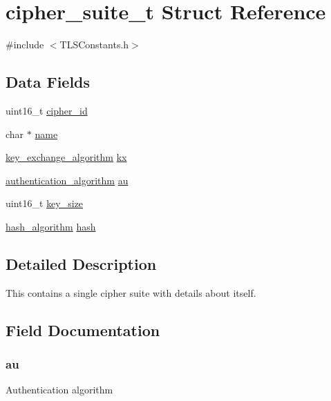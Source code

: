 \hypertarget{structcipher__suite__t}{}\section{cipher\+\_\+suite\+\_\+t Struct Reference}
\label{structcipher__suite__t}


{\ttfamily \#include $<$T\+L\+S\+Constants.\+h$>$}

\subsection*{Data Fields}
\begin{DoxyCompactItemize}
\item 
uint16\+\_\+t \hyperlink{structcipher__suite__t_abd7eac06ec5e8b636fe8916fff6c8dfa}{cipher\+\_\+id}
\item 
char $\ast$ \hyperlink{structcipher__suite__t_a5ac083a645d964373f022d03df4849c8}{name}
\item 
\hyperlink{_t_l_s_constants_8h_a7203e83530e35d8ed2f3300ba0408a54}{key\+\_\+exchange\+\_\+algorithm} \hyperlink{structcipher__suite__t_ad84bfc73673c813712dbbc08d89c53a9}{kx}
\item 
\hyperlink{_t_l_s_constants_8h_a433e2522c8a62ae4d8b1c91badefef50}{authentication\+\_\+algorithm} \hyperlink{structcipher__suite__t_a37e1ecaa52b55ec9e6f0a07042aa8da8}{au}
\item 
uint16\+\_\+t \hyperlink{structcipher__suite__t_a05d0f91f98ef3fda1cbbbdc0af1c90ca}{key\+\_\+size}
\item 
\hyperlink{_t_l_s_constants_8h_a0f89141ac474c59cb87d2eb5e16a598f}{hash\+\_\+algorithm} \hyperlink{structcipher__suite__t_af348e470337f3c253a2ed303577efa8e}{hash}
\end{DoxyCompactItemize}


\subsection{Detailed Description}
This contains a single cipher suite with details about itself. 

\subsection{Field Documentation}
\subsubsection[{\texorpdfstring{au}{au}}]{ au}\hypertarget{structcipher__suite__t_a37e1ecaa52b55ec9e6f0a07042aa8da8}{}\label{structcipher__suite__t_a37e1ecaa52b55ec9e6f0a07042aa8da8}
Authentication algorithm 

